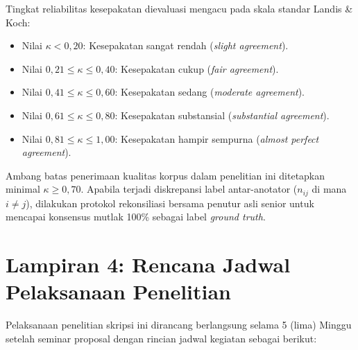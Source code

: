\vspace{0.2cm}
Tingkat reliabilitas kesepakatan dievaluasi mengacu pada skala standar Landis \& Koch:
\begin{itemize}\singlespacing
    \item Nilai $\kappa < 0{,}20$: Kesepakatan sangat rendah (\textit{slight agreement}).
    \item Nilai $0{,}21 \le \kappa \le 0{,}40$: Kesepakatan cukup (\textit{fair agreement}).
    \item Nilai $0{,}41 \le \kappa \le 0{,}60$: Kesepakatan sedang (\textit{moderate agreement}).
    \item Nilai $0{,}61 \le \kappa \le 0{,}80$: Kesepakatan substansial (\textit{substantial agreement}).
    \item Nilai $0{,}81 \le \kappa \le 1{,}00$: Kesepakatan hampir sempurna (\textit{almost perfect agreement}).
\end{itemize}

Ambang batas penerimaan kualitas korpus dalam penelitian ini ditetapkan minimal $\kappa \ge 0{,}70$. Apabila terjadi diskrepansi label antar-anotator ($n_{ij}$ di mana $i \neq j$), dilakukan protokol rekonsiliasi bersama penutur asli senior untuk mencapai konsensus mutlak 100\% sebagai label \textit{ground truth}.

\newpage

\section*{Lampiran 4: Rencana Jadwal Pelaksanaan Penelitian}

Pelaksanaan penelitian skripsi ini dirancang berlangsung selama 5 (lima) Minggu setelah seminar proposal dengan rincian jadwal kegiatan sebagai berikut:

